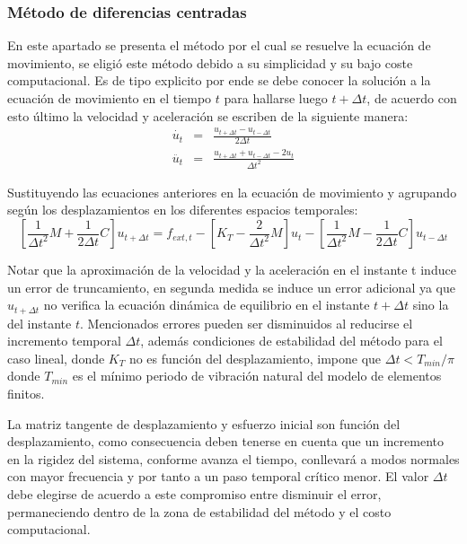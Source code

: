 \subsubsection{Método de diferencias centradas}
En este apartado se presenta el método por el cual se resuelve la ecuación de movimiento, se eligió este método debido a su simplicidad y su bajo coste computacional. Es de tipo explicito por ende se debe conocer la solución a la ecuación de movimiento en el tiempo $t$ para hallarse luego ${t+\Delta t}$, de acuerdo con esto último la velocidad y aceleración se escriben de la siguiente manera:
\begin{eqnarray}
	\dot{u_t}&=&\frac{u_{t+\Delta t}-u_{t-\Delta t}}{2 \Delta t}\\
	\ddot{u_t}&=&\frac{u_{t+\Delta t}+u_{t-\Delta t}-2u_t}{ \Delta t^2}
\end{eqnarray}

Sustituyendo las ecuaciones anteriores en la ecuación de movimiento y agrupando según los desplazamientos en los diferentes espacios temporales:
\begin{equation}
	\left[\frac{1}{\Delta t^2}M+\frac{1}{2\Delta t}C\right]u_{t+\Delta t}=f_{ext,t}-\left[K_T-\frac{2}{\Delta t^2}M\right]u_t-\left[\frac{1}{\Delta t^2}M-\frac{1}{2\Delta t}C\right]u_{t-\Delta t}
\end{equation}

Notar que la aproximación de la velocidad y la aceleración en el instante t induce un error de truncamiento, en segunda medida se induce un error adicional ya que $u_{t+\Delta t}$ no  verifica la ecuación dinámica de equilibrio en el instante $t+\Delta t$ sino la del instante $t$. Mencionados errores pueden ser disminuidos al reducirse el incremento temporal $\Delta t$, además condiciones de estabilidad del método para el caso lineal, donde $K_T $ no es función del desplazamiento, impone que $\Delta t<T_{min}/\pi$ donde $T_{min}$ es el mínimo periodo de vibración natural del modelo de elementos finitos.

La matriz tangente de desplazamiento y esfuerzo inicial son  función del desplazamiento, como consecuencia deben tenerse en cuenta que un incremento en la rigidez del sistema, conforme avanza el tiempo, conllevará a modos normales con mayor frecuencia y por tanto a un paso temporal crítico menor. El valor $\Delta t$ debe elegirse de acuerdo a este compromiso entre disminuir el error, permaneciendo dentro de la zona de estabilidad del método y el costo computacional.


